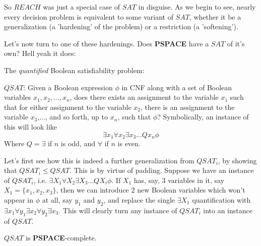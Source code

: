 So $REACH$ was just a special case of $SAT$ in disguise. As we begin to see, nearly every decision problem is equivalent to some variant of $SAT$, whether it be a generalization (a 'hardening' of the problem) or a restriction (a 'softening').
\par Let's now turn to one of these hardenings. Does \textbf{PSPACE} have a $SAT$ of it's own? Hell yeah it does:
\begin{problem} The \textit{quantified} Boolean satisfiability problem:
    \begin{center}
        $QSAT$: Given a Boolean expression $\phi$ in CNF along with a set of Boolean variables $x_1,x_2,...,x_n$, does there exists an assignment to the variable $x_1$ such that for either assignment to the variable $x_2$, there is an assignment to the variable $x_3$,..., and so forth, up to $x_n$, such that $\phi$? Symbolically, an instance of this will look like
        \[ \exists x_1 \forall x_2 \exists x_3 ... Q x_n \phi \]
        Where $Q = \exists$ if $n$ is odd, and $\forall$ if $n$ is even.
    \end{center}
\end{problem}
Let's first see how this is indeed a further generalization from $QSAT_i$, by showing that $QSAT_i \leq QSAT$. This is by virtue of padding. Suppose we have an instance of $QSAT_i$, i.e. $\exists X_1 \forall X_2 \exists X_3... QX_i \phi$. If $X_1$ has, say, $3$ variables in it, say $X_1 = \{x_1,x_2,x_3\}$, then we can introduce $2$ new Boolean variables which won't appear in $\phi$ at all, say $y_1$ and $y_2$, and replace the single $\exists X_1$ quantification with $\exists x_1 \forall y_1 \exists x_2 \forall y_2 \exists x_3$. This will clearly turn any instance of $QSAT_i$ into an instance of $QSAT$.
\begin{theorem}
    $QSAT$ is \textbf{PSPACE}-complete.
\end{theorem}
